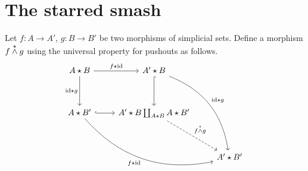 \documentclass[main.tex]{subfiles}
\begin{document}
\section{The starred smash}
\label{sec:the_starred_smash}

\begin{definition}
  \label{def:starred_smash}
  Let $f\colon A \to A'$, $g\colon B \to B'$ be two morphisms of simplicial sets. Define a morphism $f \overset{\star}{\wedge} g$ using the universal property for pushouts as follows.
  \begin{equation*}
    \begin{tikzcd}[row sep=huge]
      A \star B
      \arrow[r, "f \star \id"]
      \arrow[d, swap, "\id \star g"]
      & A' \star B
      \arrow[ddr, bend left, "\id \star g"]
      \arrow[d, hookrightarrow]
      \\
      A \star B'
      \arrow[r, hookrightarrow]
      \arrow[rrd, swap, bend right, "f \star \id"]
      & A' \star B \coprod_{A \star B} A \star B'
      \arrow[dr, dashed, "f \ssmash g"]
      \\
      && A' \star B'
    \end{tikzcd}
  \end{equation*}
\end{definition}
\end{document}
